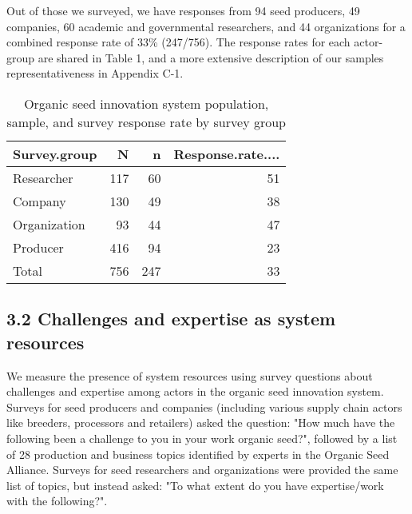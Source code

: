 \documentclass[twoside,12pt,final]{ucthesis-CA2012}
\begin{document}
\begin{ucmainmatter}
Out of those we surveyed, we have responses from 94 seed producers, 49
companies, 60 academic and governmental researchers, and 44
organizations for a combined response rate of 33\% (247/756). The
response rates for each actor-group are shared in Table 1, and a more
extensive description of our sample\textquotesingle s representativeness in Appendix
C-1.
\begin{table}

\caption{\label{tab:unnamed-chunk-16}Organic seed innovation system population, sample, and survey response rate by survey group}
\centering
\begin{tabular}[t]{lrrr}
\toprule
Survey.group & N & n & Response.rate....\\
\midrule
Researcher & 117 & 60 & 51\\
Company & 130 & 49 & 38\\
Organization & 93 & 44 & 47\\
Producer & 416 & 94 & 23\\
Total & 756 & 247 & 33\\
\bottomrule
\end{tabular}
\end{table}
\hypertarget{challenges-and-expertise-as-system-resources}{%
\subsection{3.2 Challenges and expertise as system resources}\label{challenges-and-expertise-as-system-resources}}

We measure the presence of system resources using survey questions about
challenges and expertise among actors in the organic seed innovation
system. Surveys for seed producers and companies (including various
supply chain actors like breeders, processors and retailers) asked the
question: "How much have the following been a challenge to you in your
work organic seed?", followed by a list of 28 production and business
topics identified by experts in the Organic Seed Alliance. Surveys for
seed researchers and organizations were provided the same list of
topics, but instead asked: "To what extent do you have expertise/work
with the following?".


\end{ucmainmatter}
\end{document}
